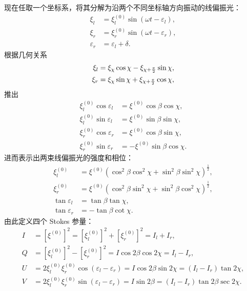 \documentclass[../天体物理基础.tex]{subfiles}
\begin{document}
现在任取一个坐标系，将其分解为沿两个不同坐标轴方向振动的线偏振光：
\begin{align}
\xi_l&=\xi_l^{\left(0\right)}\sin\left(\omega t-\varepsilon_l\right),\label{2.1.4}\\
\xi_r&=\xi_r^{\left(0\right)}\sin\left(\omega t-\varepsilon_r\right),\label{2.1.5}\\
\varepsilon_{r}&=\varepsilon_{l}+\delta.
\end{align}
根据几何关系
\begin{align}
\xi_l&=\xi_\chi\cos\chi-\xi_{\chi+\frac\pi2}\sin\chi,\notag\\
\xi_r&=\xi_\chi\sin\chi+\xi_{\chi+\frac\pi2}\cos\chi,\notag
\end{align}
推出
\begin{align}
\xi_l^{\left(0\right)}\cos\varepsilon_l&=\xi^{\left(0\right)}\cos\beta\cos\chi,\\
\xi_l^{\left(0\right)}\sin\varepsilon_l&=\xi^{\left(0\right)}\sin\beta\sin\chi,\\
\xi_r^{\left(0\right)}\cos\varepsilon_r&=\xi^{\left(0\right)}\cos\beta\sin\chi,\\
\xi_r^{\left(0\right)}\sin\varepsilon_r&=-\xi^{\left(0\right)}\sin\beta\cos\chi.
\end{align}
进而表示出两束线偏振光的强度和相位：
\begin{align}
\xi_l^{\left(0\right)}&=\xi^{\left(0\right)}\left(\cos^2\beta\cos^2\chi+\sin^2\beta\sin^2\chi\right)^\frac12,\\
\xi_r^{\left(0\right)}&=\xi^{\left(0\right)}\left(\cos^2\beta\sin^2\chi+\sin^2\beta\cos^2\chi\right)^\frac12,\\
\tan\varepsilon_l&=\tan\beta\tan\chi,\\
\tan\varepsilon_r&=-\tan\beta\cot\chi.
\end{align}
由此定义四个 Stokes 参量：
\begin{align}
I&=\left[\xi^{\left(0\right)}\right]^2=
\left[\xi_l^{\left(0\right)}\right]^2+\left[\xi_r^{\left(0\right)}\right]^2=I_l+I_r,\\
Q&=\left[\xi_l^{\left(0\right)}\right]^2-\left[\xi_r^{\left(0\right)}\right]^2=I\cos2\beta\cos2\chi=I_l-I_r,\\
U&=2\xi_l^{\left(0\right)}\xi_r^{\left(0\right)}\cos\left(\varepsilon_l-\varepsilon_r\right)=I\cos2\beta\sin2\chi=\left(I_l-I_r\right)\tan2\chi,\\
V&=2\xi_l^{\left(0\right)}\xi_r^{\left(0\right)}\sin\left(\varepsilon_l-\varepsilon_r\right)=I\sin2\beta=\left(I_l-I_r\right)\tan2\beta\sec2\chi.
\end{align}
\end{document}
